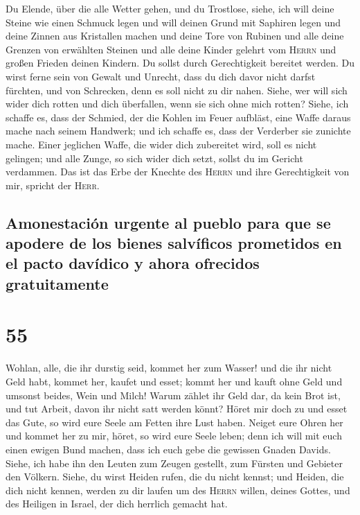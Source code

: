  Du Elende, über die alle Wetter gehen, und du Trostlose,
siehe, ich will deine Steine wie einen Schmuck legen und will deinen
Grund mit Saphiren legen  und deine Zinnen aus Kristallen
machen und deine Tore von Rubinen und alle deine Grenzen von erwählten
Steinen  und alle deine Kinder gelehrt vom \textsc{Herrn}
und großen Frieden deinen Kindern.  Du sollst durch
Gerechtigkeit bereitet werden. Du wirst ferne sein von Gewalt und
Unrecht, dass du dich davor nicht darfst fürchten, und von Schrecken,
denn es soll nicht zu dir nahen.  Siehe, wer will sich
wider dich rotten und dich überfallen, wenn sie sich ohne mich rotten?
 Siehe, ich schaffe es, dass der Schmied, der die Kohlen
im Feuer aufbläst, eine Waffe daraus mache nach seinem Handwerk; und ich
schaffe es, dass der Verderber sie zunichte mache.  Einer
jeglichen Waffe, die wider dich zubereitet wird, soll es nicht gelingen;
und alle Zunge, so sich wider dich setzt, sollst du im Gericht
verdammen. Das ist das Erbe der Knechte des \textsc{Herrn} und ihre
Gerechtigkeit von mir, spricht der \textsc{Herr}.

\hypertarget{amonestaciuxf3n-urgente-al-pueblo-para-que-se-apodere-de-los-bienes-salvuxedficos-prometidos-en-el-pacto-davuxeddico-y-ahora-ofrecidos-gratuitamente}{%
\subsection{Amonestación urgente al pueblo para que se apodere de los
bienes salvíficos prometidos en el pacto davídico y ahora ofrecidos
gratuitamente}\label{amonestaciuxf3n-urgente-al-pueblo-para-que-se-apodere-de-los-bienes-salvuxedficos-prometidos-en-el-pacto-davuxeddico-y-ahora-ofrecidos-gratuitamente}}

\hypertarget{section-54}{%
\section{55}\label{section-54}}

 Wohlan, alle, die ihr durstig seid, kommet her zum
Wasser! und die ihr nicht Geld habt, kommet her, kaufet und esset; kommt
her und kauft ohne Geld und umsonst beides, Wein und Milch!
 Warum zählet ihr Geld dar, da kein Brot ist, und tut
Arbeit, davon ihr nicht satt werden könnt? Höret mir doch zu und esset
das Gute, so wird eure Seele am Fetten ihre Lust haben. 
Neiget eure Ohren her und kommet her zu mir, höret, so wird eure Seele
leben; denn ich will mit euch einen ewigen Bund machen, dass ich euch
gebe die gewissen Gnaden Davids.  Siehe, ich habe ihn den
Leuten zum Zeugen gestellt, zum Fürsten und Gebieter den Völkern.
 Siehe, du wirst Heiden rufen, die du nicht kennst; und
Heiden, die dich nicht kennen, werden zu dir laufen um des
\textsc{Herrn} willen, deines Gottes, und des Heiligen in Israel, der
dich herrlich gemacht hat.

